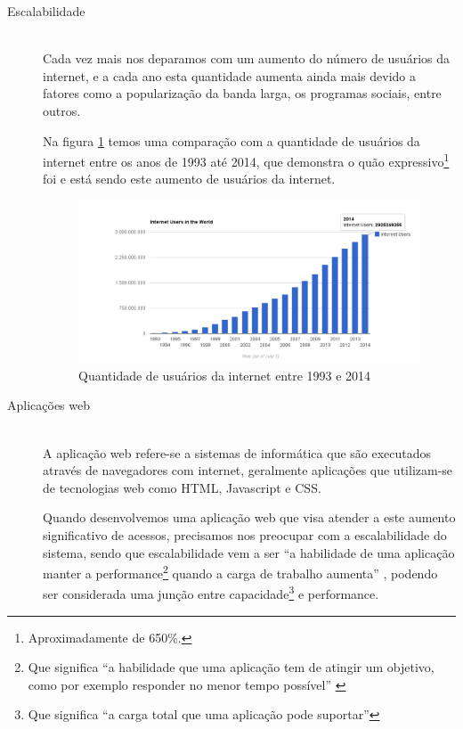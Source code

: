 \begin{description}
\item[Escalabilidade] \hfill \\
Cada vez mais nos deparamos com um aumento do número de usuários da internet, e a cada ano esta quantidade aumenta ainda mais devido a fatores como a popularização da banda larga, os programas sociais, entre outros.

Na figura \ref{fig:Quantidade de usuários da internet entre 1993 e 2014} \cite{intStats} temos uma comparação com a quantidade de usuários da internet entre os anos de 1993 até 2014, que demonstra o quão expressivo\footnote{Aproximadamente de 650\%.} foi e está sendo este aumento de usuários da internet. 

\begin{figure}[htb]
\centering
\includegraphics[scale=0.45]{images/internet_usage.png}
\caption{Quantidade de usuários da internet entre 1993 e 2014}
\label{fig:Quantidade de usuários da internet entre 1993 e 2014}
\end{figure}

\newpage

\item[Aplicações web] \hfill \\
A aplicação web refere-se a sistemas de informática que são executados através de navegadores com internet, geralmente aplicações que utilizam-se de tecnologias web como HTML, Javascript e CSS.\cite{appWeb}

Quando desenvolvemos uma aplicação web que visa atender a este aumento significativo de acessos, precisamos nos preocupar com a escalabilidade do sistema, sendo que escalabilidade vem a ser ``a habilidade de uma aplicação manter a performance\footnote{Que significa ``a habilidade que uma aplicação tem de atingir um objetivo, como por exemplo responder no menor tempo possível'' \cite{escTerm}} quando a carga de trabalho aumenta'' \cite{escTerm}, podendo ser considerada uma junção entre capacidade\footnote{Que significa ``a carga total que uma aplicação pode suportar''\cite{escTerm}} e performance. 



\end{description}
